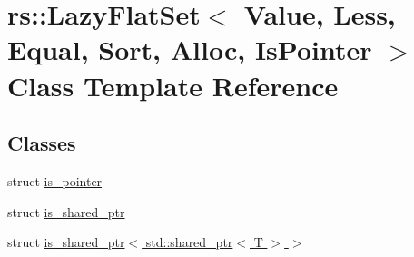 \hypertarget{classrs_1_1_lazy_flat_set}{\section{rs\+:\+:Lazy\+Flat\+Set$<$ Value, Less, Equal, Sort, Alloc, Is\+Pointer $>$ Class Template Reference}
\label{classrs_1_1_lazy_flat_set}
}
\subsection*{Classes}
\begin{DoxyCompactItemize}
\item 
struct \hyperlink{structrs_1_1_lazy_flat_set_1_1is__pointer}{is\+\_\+pointer}
\item 
struct \hyperlink{structrs_1_1_lazy_flat_set_1_1is__shared__ptr}{is\+\_\+shared\+\_\+ptr}
\item 
struct \hyperlink{structrs_1_1_lazy_flat_set_1_1is__shared__ptr_3_01std_1_1shared__ptr_3_01_t_01_4_01_4}{is\+\_\+shared\+\_\+ptr$<$ std\+::shared\+\_\+ptr$<$ T $>$ $>$}
\end{DoxyCompactItemize}
